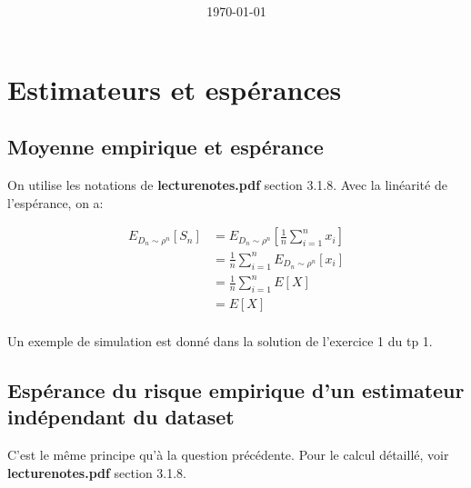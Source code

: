 \documentclass[
10pt, %
a4paper, %
oneside, %
headinclude,footinclude, %
BCOR5mm, %
]{scrartcl}
\title{\normalfont{FTML Exercices 3 solutions}\\
}
\author{\spacedlowsmallcaps{}
}
\date{\today}
\begin{document}
\renewcommand{\sectionmark}[1]{\markright{\spacedlowsmallcaps{#1}}}
\lehead{\mbox{\llap{\small\thepage\kern1em\color{halfgray} \vline}\color{halfgray}\hspace{0.5em}\rightmark\hfil}} 
\pagestyle{scrheadings}
\maketitle 
\setcounter{tocdepth}{3} 

\tableofcontents

\section{\large\color{Blue}Estimateurs et espérances}

\subsection{Moyenne empirique et espérance}

On utilise les notations de \textbf{lecture\textunderscore notes.pdf} section 3.1.8. Avec la linéarité de l'espérance, on a:

\begin{equation}
	\begin{aligned}
		\label{eq:}
		E_{D_n\sim \rho^n}[S_n] &= E_{D_n\sim \rho^n}[\frac{1}{n}\sum_{i=1}^n x_i]\\
		    &= \frac{1}{n}\sum_{i=1}^n E_{D_n\sim \rho^n}[x_i]\\
		    &= \frac{1}{n}\sum_{i=1}^n E[X]\\
		    &= E[X]\\
	\end{aligned}
\end{equation}

Un exemple de simulation est donné dans la solution de l'exercice 1 du tp 1.


\subsection{Espérance du risque empirique d'un estimateur indépendant du dataset}

C'est le même principe qu'à la question précédente. Pour le calcul détaillé, voir \textbf{lecture\textunderscore notes.pdf} section 3.1.8.
\end{document}
